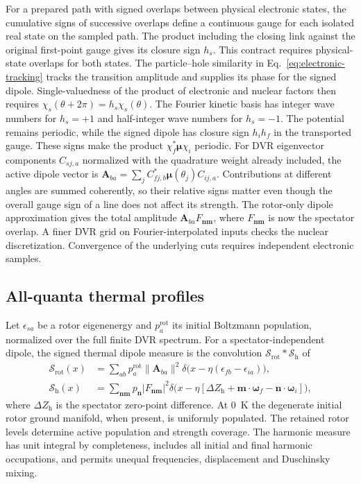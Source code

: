 For a prepared path with signed overlaps between physical electronic
states, the cumulative signs of successive overlaps define a continuous
gauge for each isolated real state on the sampled path. The product
including the closing link against the original first-point gauge gives
its closure sign $h_s$. This contract requires physical-state overlaps
for both states. The particle--hole similarity in
Eq.~\eqref{eq:electronic-tracking} tracks the transition amplitude and
supplies its phase for the signed dipole.
Single-valuedness of the product of electronic and nuclear factors then
requires $\chi_s(\theta+2\pi)=h_s\chi_s(\theta)$. The Fourier kinetic basis
has integer wave numbers for $h_s=+1$ and half-integer wave numbers for
$h_s=-1$. The potential remains periodic, while the signed dipole has
closure sign $h_i h_f$ in the transported gauge.\cite{longuethiggins}
These signs make the product $\chi_f^*\boldsymbol\mu\chi_i$ periodic.
For DVR eigenvector components $C_{sj,a}$ normalized with the quadrature
weight already included, the active dipole vector is
$\mathbf A_{ba}=\sum_j C_{fj,b}^*\boldsymbol\mu(\theta_j)C_{ij,a}$.
Contributions at different angles are summed coherently, so their
relative signs matter even though the overall gauge sign of a line
does not affect its strength. The rotor-only dipole approximation gives
the total amplitude $\mathbf A_{ba} F_{\mathbf n\mathbf m}$, where
$F_{\mathbf n\mathbf m}$ is now the spectator overlap. A finer DVR grid
on Fourier-interpolated inputs checks the nuclear discretization.
Convergence of the underlying cuts requires independent electronic
samples.

\subsection{All-quanta thermal profiles}

Let $\epsilon_{sa}$ be a rotor eigenenergy and $p^{\mathrm{rot}}_a$ its
initial Boltzmann population, normalized over the full finite DVR spectrum.
For a spectator-independent dipole, the signed thermal dipole measure is
the convolution $\mathcal S_{\mathrm{rot}}*\mathcal S_{\mathrm{h}}$ of
\begin{align}
 \mathcal S_{\mathrm{rot}}(x)&=
 \sum_{ab} p^{\mathrm{rot}}_a\|\mathbf A_{ba}\|^2
  \delta\bigl(x-\eta(\epsilon_{fb}-\epsilon_{ia})\bigr),\\
 \mathcal S_{\mathrm{h}}(x)&=
 \sum_{\mathbf n\mathbf m} p_{\mathbf n}|F_{\mathbf n\mathbf m}|^2
  \delta\bigl(x-\eta[\Delta Z_{\mathrm h}+\mathbf m\cdot\boldsymbol\omega_f
                           -\mathbf n\cdot\boldsymbol\omega_i]\bigr),
\end{align}
where $\Delta Z_{\mathrm h}$ is the spectator zero-point difference. At
0~K the degenerate initial rotor ground manifold, when present, is
uniformly populated. The retained rotor levels determine active population
and strength coverage.
The harmonic measure has unit integral by completeness, includes all
initial and final harmonic occupations, and permits unequal frequencies,
displacement and Duschinsky mixing.

